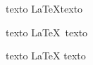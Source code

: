 \documentclass[a4paper,12pt]{article}
\begin{document}
	texto \LaTeX   texto
	 
	texto \LaTeX\  texto 
	
	texto \LaTeX{} texto 	   %
					
\end{document}
